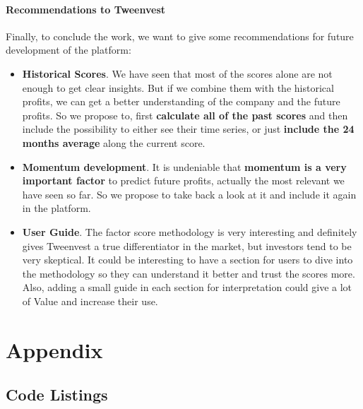 \documentclass[11pt,english,a4paper,hidelinks]{book}
\begin{document}
\subsection{Recommendations to Tweenvest}

Finally, to conclude the work, we want to give some recommendations for future development of the platform:
\begin{itemize}
    \item \textbf{Historical Scores}. We have seen that most of the scores alone are not enough to get clear insights. But if we combine them with the historical profits, we can get a better understanding of the company and the future profits. So we propose to, first \textbf{calculate all of the past scores} and then include the possibility to either see their time series, or just \textbf{include the 24 months average} along the current score.
    \item \textbf{Momentum development}. It is undeniable that \textbf{momentum is a very important factor} to predict future profits, actually the most relevant we have seen so far. So we propose to take back a look at it and include it again in the platform.
    \item \textbf{User Guide}. The factor score methodology is very interesting and definitely gives Tweenvest a true differentiator in the market, but investors tend to be very skeptical. It could be interesting to have a section for users to dive into the methodology so they can understand it better and trust the scores more. Also, adding a small guide in each section for interpretation could give a lot of Value and increase their use. 
\end{itemize}

\printbibliography[heading=bibintoc, title=References and Bibliography]
\label{sec:biblio}
\newpage

\part{Appendix}

\chapter{Code Listings}
\end{document}
